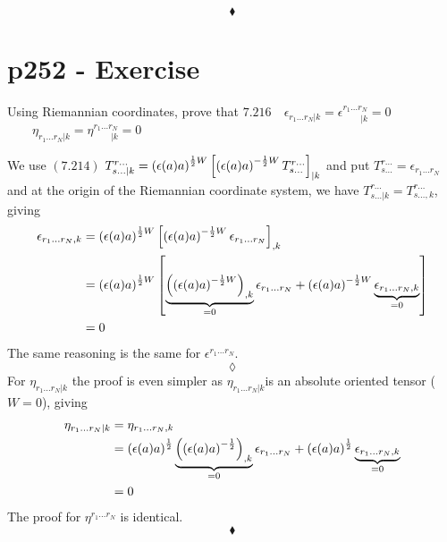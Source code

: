 $$\blacklozenge$$
\newpage

\section{p252 - Exercise }
\begin{tcolorbox}
Using Riemannian coordinates, prove that 
$\mathbf{7.216}\quad \epsilon_{r_1\dots r_N|k}=\epsilon^{r_1\dots r_N}_{\quad\quad |k}=0$
$\quad \quad \eta_{r_1\dots r_N|k}= \eta^{r_1\dots r_N}_{\quad\quad|k}=0$
\end{tcolorbox}
We use $\mathbf{(7.214)}$   $T^{r\dots}_{s\dots |k}= \left(\epsilon(a)a\right)^{\frac{1}{2} W}\left[ \left(\epsilon(a)a\right)^{-\frac{1}{2} W} T^{r\dots}_{s\dots }\right]_{|k}$ and put $T^{r\dots}_{s\dots }=\epsilon_{r_1 \dots r_N}$ and at the origin of the Riemannian coordinate system, we have $T^{r\dots}_{s\dots |k}=T^{r\dots}_{s\dots,k}$, giving
\begin{align}
\epsilon_{r_1 \dots r_N,k} &= \left(\epsilon(a)a\right)^{\frac{1}{2} W}\left[ \left(\epsilon(a)a\right)^{-\frac{1}{2} W} \epsilon_{r_1 \dots r_N}\right]_{,k}\\
&= \left(\epsilon(a)a\right)^{\frac{1}{2} W}\left[ \underbrace{\left(\left(\epsilon(a)a\right)^{-\frac{1}{2} W}\right)_{,k}}_{=0} \epsilon_{r_1 \dots r_N}+\left(\epsilon(a)a\right)^{-\frac{1}{2} W} \underbrace{\epsilon_{r_1 \dots r_N,k}}_{=0}\right]\\
&=0
\end{align}
The same reasoning is the same for $\epsilon^{r_1\dots r_N}$.
$$\lozenge$$
For $ \eta_{r_1\dots r_N|k}$ the proof is even simpler as $ \eta_{r_1\dots r_N|k}$is an absolute oriented tensor ($W=0$), giving 
\begin{align}
\eta_{r_1 \dots r_N|k} &= \eta_{r_1 \dots r_N,k}\\
&= \left(\epsilon(a)a\right)^{\frac{1}{2} } \underbrace{\left(\left(\epsilon(a)a\right)^{-\frac{1}{2} }\right)_{,k}}_{=0} \epsilon_{r_1 \dots r_N}+\left(\epsilon(a)a\right)^{\frac{1}{2} } \underbrace{\epsilon_{r_1 \dots r_N,k}}_{=0}\\
&=0
\end{align}
The proof for $\eta^{r_1\dots r_N}$ is identical.
$$\blacklozenge$$
\newpage




